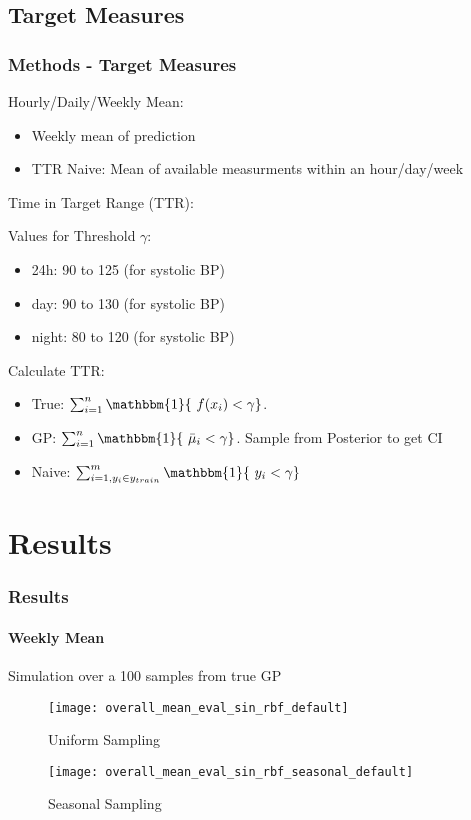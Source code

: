 \documentclass[
	8pt, %
]{beamer}
\begin{document}
\subsection{Target Measures}

\begin{frame}
	\frametitle{Methods - Target Measures}

	Hourly/Daily/Weekly Mean:
	\begin{itemize}
		\item Weekly mean of prediction
		\item TTR Naive: Mean of available measurments within an hour/day/week
	\end{itemize}


	\bigskip

	Time in Target Range (TTR):

	Values for Threshold $\gamma$:
	\begin{itemize}
		\item 24h: 90 to 125 (for systolic BP)
		\item day: 90 to 130 (for systolic BP)
		\item night: 80 to 120 (for systolic BP)
	\end{itemize}

	Calculate TTR:
	\begin{itemize}
			\item True: $\sum_{i=1}^{n} \mathbbm{1}\{\ f(x_i) < \gamma \}$.
			\item GP: $\sum_{i=1}^{n} \mathbbm{1}\{\ \bar{\mu}_i < \gamma \}$. Sample from Posterior to get CI
			\item Naive: $\sum_{i=1, y_i \in y_{train}}^{m} \mathbbm{1}\{\ y_i < \gamma \}$
	\end{itemize}

\end{frame}



\section{Results}

\begin{frame}
	\frametitle{Results}
	\framesubtitle{Weekly Mean} %

	Simulation over a 100 samples from true GP

	\begin{figure}
			\texttt{[image: overall\_mean\_eval\_sin\_rbf\_default]}
			\caption{Uniform Sampling}
	\end{figure}

	\begin{figure}
			\texttt{[image: overall\_mean\_eval\_sin\_rbf\_seasonal\_default]}
			\caption{Seasonal Sampling}
	\end{figure}

\end{frame}
\end{document}
